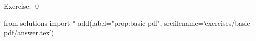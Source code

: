 
\begin{prop}
  \label{prop:basic-pdf}
  
\end{prop}
\proof
Exercise.
\qed
\begin{python0}
from solutions import *
add(label="prop:basic-pdf",
    srcfilename='exercises/basic-pdf/answer.tex') 
\end{python0}
